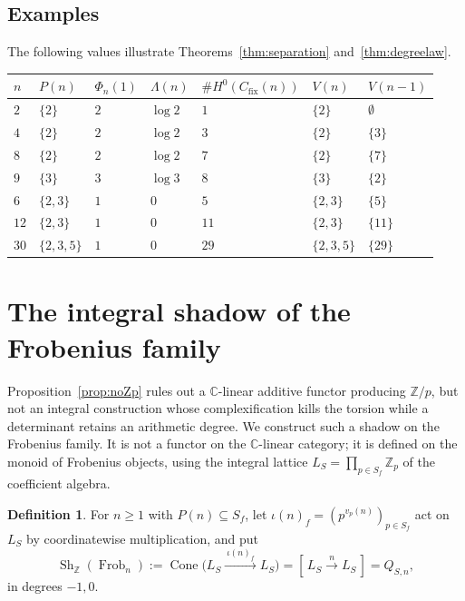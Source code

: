\documentclass[11pt]{amsart}
\theoremstyle{definition}
\newtheorem{definition}[theorem]{Definition}
\theoremstyle{remark}
\newcommand{\C}{\mathbb C}
\newcommand{\Z}{\mathbb Z}
\newcommand{\Frob}{\operatorname{Frob}}
\newcommand{\Sh}{\operatorname{Sh}}
\newcommand{\Cone}{\operatorname{Cone}}
\begin{document}
\subsection*{Examples}

The following values illustrate Theorems~\ref{thm:separation}
and~\ref{thm:degreelaw}.

\begin{center}
\small
\begin{tabular}{lllllll}
\toprule
$n$ & $P(n)$ & $\Phi_n(1)$ & $\Lambda(n)$ & $\#H^0(C_{\mathrm{fix}}(n))$ &
 $V(n)$ & $V(n-1)$\\
\midrule
$2$  & $\{2\}$     & $2$ & $\log2$ & $1$  & $\{2\}$     & $\emptyset$\\
$4$  & $\{2\}$     & $2$ & $\log2$ & $3$  & $\{2\}$     & $\{3\}$\\
$8$  & $\{2\}$     & $2$ & $\log2$ & $7$  & $\{2\}$     & $\{7\}$\\
$9$  & $\{3\}$     & $3$ & $\log3$ & $8$  & $\{3\}$     & $\{2\}$\\
$6$  & $\{2,3\}$   & $1$ & $0$     & $5$  & $\{2,3\}$   & $\{5\}$\\
$12$ & $\{2,3\}$   & $1$ & $0$     & $11$ & $\{2,3\}$   & $\{11\}$\\
$30$ & $\{2,3,5\}$ & $1$ & $0$     & $29$ & $\{2,3,5\}$ & $\{29\}$\\
\bottomrule
\end{tabular}
\end{center}

\section{The integral shadow of the Frobenius family}\label{sec:shadow}

Proposition~\ref{prop:noZp} rules out a $\C$-linear additive functor producing
$\Z/p$, but not an integral construction whose complexification kills the
torsion while a determinant retains an arithmetic degree.  We construct such a
shadow on the Frobenius family.  It is not a functor on the $\C$-linear
category; it is defined on the monoid of Frobenius objects, using the integral
lattice $L_S=\prod_{p\in S_f}\Z_p$ of the coefficient algebra.

\begin{definition}\label{def:shadow}
For $n\ge1$ with $P(n)\subseteq S_f$, let
$\iota(n)_f=(p^{v_p(n)})_{p\in S_f}$ act on $L_S$ by coordinatewise
multiplication, and put
\begin{equation}\label{eq:shadow}
  \Sh_\Z(\Frob_n):=\Cone\bigl(L_S\xrightarrow{\ \iota(n)_f\ }L_S\bigr)
   =[\,L_S\xrightarrow{\ n\ }L_S\,]=Q_{S,n},
\end{equation}
in degrees $-1,0$.
\end{definition}
\end{document}
